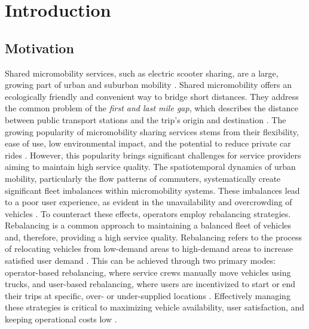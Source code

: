 \chapter{Introduction}\label{sec:introduction} %

\section{Motivation}\label{sec:introduction-motivation}
Shared micromobility services, such as electric scooter sharing, are a large, growing part of urban and suburban mobility \cite{oeschger_micromobility_2020}.
Shared micromobility offers an ecologically friendly and convenient way to bridge short distances.
They address the common problem of the \textit{first and last mile gap}, which describes the distance between public transport stations and the trip's origin and destination \cite{liao_electric_2022}.
The growing popularity of micromobility sharing services stems from their flexibility, ease of use, low environmental impact, and the potential to reduce private car rides \cite{jaber_preferences_2023}.
However, this popularity brings significant challenges for service providers aiming to maintain high service quality.
The spatiotemporal dynamics of urban mobility, particularly the flow patterns of commuters, systematically create significant fleet imbalances within micromobility systems.
These imbalances lead to a poor user experience, as evident in the unavailability and overcrowding of vehicles \cite{wu_challenges_2020}.
To counteract these effects, operators employ rebalancing strategies.
Rebalancing is a common approach to maintaining a balanced fleet of vehicles and, therefore, providing a high service quality.
Rebalancing refers to the process of relocating vehicles from low-demand areas to high-demand areas to increase satisfied user demand \cite{dellamico_bike_2014}.
This can be achieved through two primary modes: operator-based rebalancing, where service crews manually move vehicles using trucks, and user-based rebalancing, where users are incentivized to start or end their trips at specific, over- or under-supplied locations \cite{emami_integrated_2024}.
Effectively managing these strategies is critical to maximizing vehicle availability, user satisfaction, and keeping operational costs low \cite{dellamico_bike_2014}.

